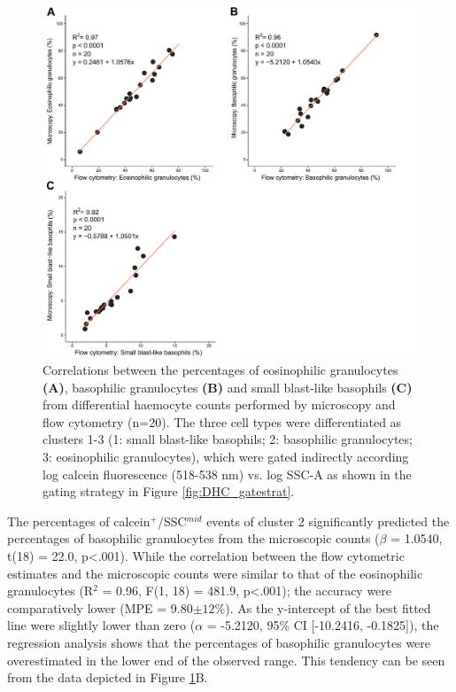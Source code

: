 \begin{figure}[H]
    \centering
    \includegraphics[width=1.0\textwidth]{figures/Gating strategy/SSC Calcein validation.pdf}
    \caption{Correlations between the percentages of eosinophilic granulocytes \textbf{(A)}, basophilic granulocytes \textbf{(B)} and small blast-like basophils \textbf{(C)} from differential haemocyte counts performed by microscopy and flow cytometry (n=20). The three cell types were differentiated as clusters 1-3 (1: small blast-like basophils; 2: basophilic granulocytes; 3: eosinophilic granulocytes), which were gated indirectly according log calcein fluorescence (518-538 nm) vs. log SSC-A as shown in the gating strategy in Figure \ref{fig:DHC_gatestrat}.}
    \label{fig:DHC_lin}
\end{figure}

\noindent The percentages of calcein$^{+}$/SSC$^{mid}$ events of cluster 2 significantly predicted the percentages of basophilic granulocytes from the microscopic counts ($\beta$ = 1.0540, t(18) = 22.0, p<.001). While the correlation between the flow cytometric estimates and the microscopic counts were similar to that of the eosinophilic granulocytes (R$^{2}$ = 0.96, F(1, 18) = 481.9, p<.001); the accuracy were comparatively lower (MPE = 9.80$\pm{12}$\%). As the y-intercept of the best fitted line were slightly lower than zero ($\alpha$ = -5.2120, 95\% CI [-10.2416, -0.1825]), the regression analysis shows that the percentages of basophilic granulocytes were overestimated in the lower end of the observed range. This tendency can be seen from the data depicted in Figure \ref{fig:DHC_lin}B.


